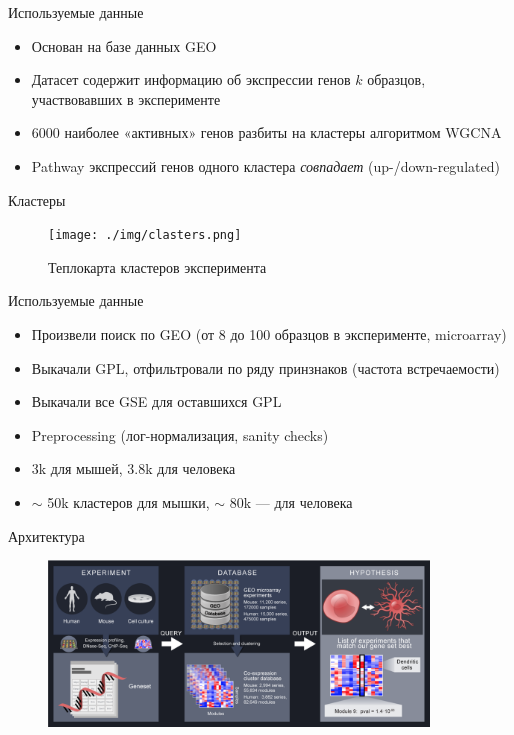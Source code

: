 \documentclass[10pt,pdf,utf8,russian,aspectratio=169]{beamer}
\begin{document}
\begin{frame}{Используемые данные}
  \begin{itemize}[<+->]
    \item Основан на базе данных GEO
    \item Датасет содержит информацию об экспрессии генов $k$ образцов, участвовавших в эксперименте
    \item 6000 наиболее «активных» генов разбиты на кластеры алгоритмом WGCNA
    \item Pathway экспрессий генов одного кластера \emph{совпадает} (up-/down-regulated)
  \end{itemize}
\end{frame}

\begin{frame}{Кластеры}
    \begin{figure}[p]
        \centering
        \caption{Теплокарта кластеров эксперимента}
        \texttt{[image: ./img/clasters.png]}
    \end{figure}      
\end{frame}

\begin{frame}{Используемые данные}
  \begin{itemize}[<+->]
    \item Произвели поиск по GEO (от 8 до 100 образцов в эксперименте, microarray)
    \item Выкачали GPL, отфильтровали по ряду принзнаков (частота встречаемости)
    \item Выкачали все GSE для оставшихся GPL
    \item Preprocessing (лог-нормализация, sanity checks)
    \item 3k для мышей, 3.8k для человека
    \item $\sim$ 50k кластеров для мышки, $\sim$ 80k --- для человека
  \end{itemize}
\end{frame}

\begin{frame}{Архитектура}
    \begin{figure}[p]
        \centering
        \includegraphics[width=0.9\textwidth]{./img/architecture.png}
    \end{figure}      
\end{frame}
\end{document}
